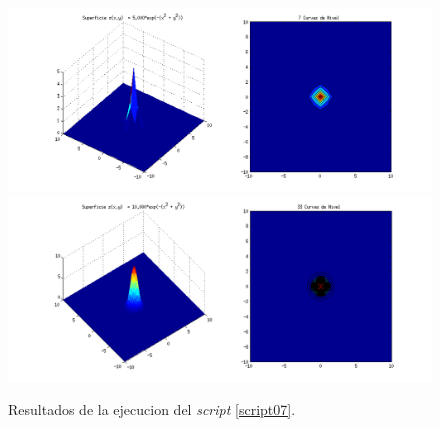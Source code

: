 \documentclass[a4paper,12pt,final]{article}
\begin{document}
      \begin{figure}[H]
        \caption{Resultados de la ejecucion del \emph{script} \ref{script07}.}
        \label{script07figure1}
        \includegraphics[width=\textwidth]{./laboratorio_1/problema07_sample1.png}
        \includegraphics[width=\textwidth]{./laboratorio_1/problema07_sample2.png}
      \end{figure}
\end{document}
